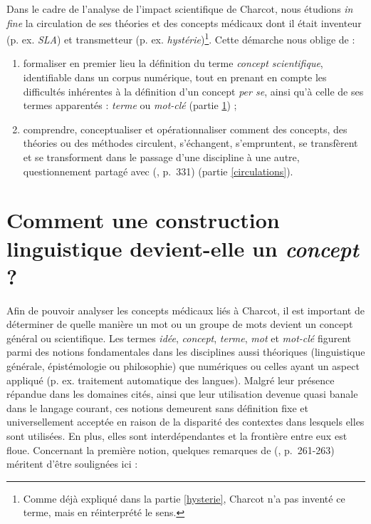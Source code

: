 Dans le cadre de l'analyse de l'impact scientifique de Charcot, nous étudions \textit{in fine} la circulation de ses théories et des concepts médicaux dont il était inventeur (p. ex. \textit{SLA}) et transmetteur (p. ex. \textit{hystérie})\footnote{Comme déjà expliqué dans la partie \ref{hysterie}, Charcot n'a pas inventé ce terme, mais en réinterprété le sens.}. Cette démarche nous oblige de :
\begin{enumerate}
\item formaliser en premier lieu la définition du terme \textit{concept scientifique}, identifiable dans un corpus numérique, tout en prenant en compte les difficultés inhérentes à la définition d'un concept \textit{per se}, ainsi qu'à celle de ses termes apparentés : \textit{terme} ou \textit{mot-clé} (partie \ref{concept}) ;
\item comprendre, conceptualiser et opérationnaliser \og{}comment des concepts, des théories ou des méthodes circulent, s'échangent, s'empruntent, se transfèrent et se transforment dans le passage d'une discipline à une autre\fg{}, questionnement partagé avec \citeauthor{landais2014frederic} (\citeyear{landais2014frederic}, p.~331) (partie \ref{circulations}).
\end{enumerate}



\section{Comment une construction linguistique devient-elle un \textit{concept} ?}
\label{concept}

Afin de pouvoir analyser les concepts médicaux liés à Charcot, il est important de déterminer de quelle manière un mot ou un groupe de mots devient un concept général ou scientifique. Les termes \textit{idée}, \textit{concept}, \textit{terme}, \textit{mot} et \textit{mot-clé} figurent parmi des notions fondamentales dans les disciplines aussi théoriques (linguistique générale, épistémologie ou philosophie) que numériques ou celles ayant un aspect appliqué (p. ex. traitement automatique des langues). 
Malgré leur présence répandue dans les domaines cités, ainsi que leur utilisation devenue quasi banale dans le langage courant, ces notions demeurent sans définition fixe et universellement acceptée en raison de la disparité des contextes dans lesquels elles sont utilisées. En plus, elles sont interdépendantes et la frontière entre eux est floue. Concernant la première notion, quelques remarques de \citeauthor{Lecourt1999} (\citeyear{Lecourt1999}, p.~261-263) méritent d'être soulignées ici :

